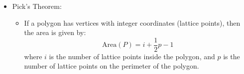 \begin{itemize}
\item Pick's Theorem:

\begin{itemize}
    \item If a polygon has vertices with integer coordinates (lattice points), then the area is given by:
    \[
    \text{Area}(P) = i + \frac{1}{2}p - 1
    \]
    where \(i\) is the number of lattice points inside the polygon, and \(p\) is the number of lattice points on the perimeter of the polygon.
\end{itemize}
\end{itemize}